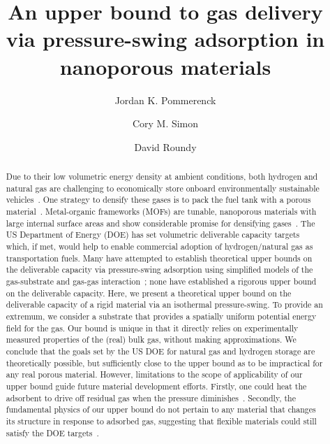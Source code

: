 \documentclass[letterpaper,twocolumn,amsmath,amssymb,jcp]{revtex4-1}
\begin{document}
\title{
An upper bound to gas delivery via pressure-swing adsorption in nanoporous materials}

\author{Jordan K. Pommerenck}
\author{Cory M. Simon}
\author{David Roundy}

\begin{abstract}
Due to their low volumetric energy density at ambient conditions, both hydrogen
and natural gas are challenging to economically store onboard environmentally
sustainable vehicles~\cite{mason2014evaluating, sircar2002pressure}. One
strategy to densify these gases is to pack the fuel tank with a porous
material~\cite{schoedel2016role}. Metal-organic frameworks (MOFs) are tunable, nanoporous
materials with large internal surface areas and show considerable promise for
densifying gases~\cite{makal2012methane,mason2014evaluating,
suh2011hydrogen,garcia2018benchmark, schoedel2016role}. The US Department of
Energy (DOE) has set volumetric deliverable capacity targets~\cite{simon2015materials, h2targetsDOE} which, if met, would help to enable 
commercial adoption of hydrogen/natural gas as
transportation fuels. Many have attempted to establish theoretical upper bounds
on the deliverable capacity via pressure-swing adsorption using simplified
models of the gas-substrate and gas-gas interaction~\cite{gomez2014exploring, 
gomez2017impact, kaija2018high, lee2019predicting}; none have
established a rigorous upper bound on the deliverable capacity.
Here, we present a theoretical upper bound on the deliverable capacity of a
rigid material via an isothermal pressure-swing. To provide an extremum, we
consider a substrate that provides a spatially uniform potential energy field
for the gas. Our bound is unique in that it directly relies on experimentally
measured properties of the (real) bulk gas, without making approximations.
We conclude that the goals set by the US DOE for natural gas and hydrogen
storage are theoretically possible, but sufficiently close to the upper bound
as to be impractical for any real porous material. However, limitations to the
scope of applicability of our upper bound guide future material development 
efforts. Firstly, one could heat the adsorbent to drive off residual gas when
the pressure diminishes~\cite{gomez2014exploring}. Secondly, the fundamental
physics of our upper bound do not pertain to any material that changes its
structure in response to adsorbed gas, suggesting that flexible materials could
still satisfy the DOE targets~\cite{schneemann2014flexible, choi2008broadly, mason2015methane}.


\end{abstract}
\end{document}
